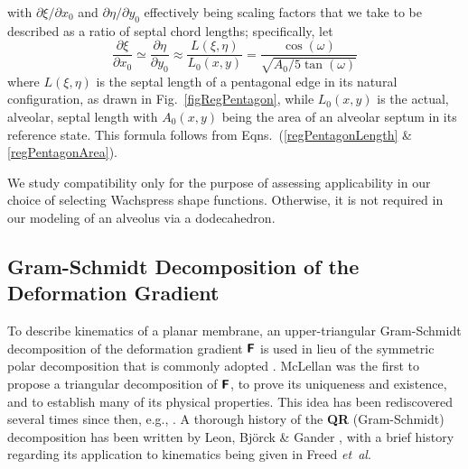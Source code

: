 with $\partial \xi / \partial x_0$ and $\partial \eta / \partial y_0$ effectively being scaling factors that we take to be described as a ratio of septal chord lengths; specifically, let
\begin{equation}
\frac{\partial \xi}{\partial x_0} \simeq
\frac{\partial \eta}{\partial y_0} \approx 
\frac{L(\xi, \eta)}{L_0 (x, y)} = 
\frac{\cos (\omega)}{\sqrt{A_0 / 5 \tan (\omega)}}
\end{equation}
where $L(\xi,\eta)$ is the septal length of a pentagonal edge in its natural configuration, as drawn in Fig.~\ref{figRegPentagon}, while $L_0(x,y)$ is the actual, alveolar, septal length with $A_0(x,y)$ being the area of an alveolar septum in its reference state.  This formula follows from Eqns.~(\ref{regPentagonLength} \& \ref{regPentagonArea}).

We study compatibility only for the purpose of assessing applicability in our choice of selecting Wachspress shape functions.  Otherwise, it is not required in our modeling of an alveolus via a dodecahedron. 

\subsection{Gram-Schmidt Decomposition of the Deformation Gradient}
\label{secQR}

To describe kinematics of a planar membrane, an upper-triangular Gram-Schmidt decomposition of the deformation gradient $\boldsymbol{\mathsf{F}}$ is used in lieu of the symmetric polar decomposition that is commonly adopted \cite{Srinivasa12,FreedSrinivasa15,Freedetal17,FreedZamani19,Freedetal19}.  McLellan \cite{McLellan76,McLellan80} was the first to propose a triangular decomposition of $\boldsymbol{\mathsf{F}}$, to prove its uniqueness and existence, and to establish many of its physical properties.  This idea has been rediscovered several times since then, e.g., \cite{Rosakis90,Souchet93,Srinivasa12}.  A thorough history of the \textbf{QR} (Gram-Schmidt) decomposition has been written by Leon, Bj\"orck \& Gander \cite{Leonetal13}, with a brief history regarding its application to kinematics being given in Freed \textit{et~al}. \cite{Freedetal19}

